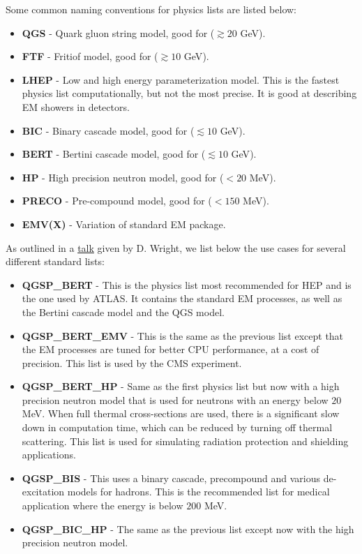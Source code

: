 \documentclass[8pt]{refart}
\begin{document}
 Some common naming conventions for physics lists are listed below:
\begin{itemize}
    \item \textbf{QGS} - Quark gluon string model, good for ({\color{red}$\gtrsim 20$ GeV}).
    \item \textbf{FTF} - Fritiof model, good for ({\color{red}$\gtrsim 10$ GeV}).
    \item \textbf{LHEP} - Low and high energy parameterization model.  This is the fastest physics list computationally, but not the most precise.  It is good at describing EM showers in detectors.
    \item \textbf{BIC} - Binary cascade model, good for ({\color{magenta}$\lesssim 10$ GeV}).
    \item \textbf{BERT} - Bertini cascade model, good for ({\color{magenta}$\lesssim 10$ GeV}).
    \item \textbf{HP} - High precision neutron model, good for ({\color{blue}$< 20$ MeV}).
    \item \textbf{PRECO} - Pre-compound model, good for ({\color{blue}$< 150$ MeV}).
    \item \textbf{EMV(X)} - Variation of standard EM package.
\end{itemize}
As outlined in a \href{http://geant4.in2p3.fr/IMG/pdf_PhysicsLists.pdf}{talk} given by D. Wright, we list below the use cases for several different standard lists:
\begin{itemize}
    \item \textbf{QGSP\_BERT} - This is the physics list most recommended for HEP and is the one used by ATLAS.  It contains the standard EM processes, as well as the Bertini cascade model and the QGS model.
    \item \textbf{QGSP\_BERT\_EMV} - This is the same as the previous list except that the EM processes are tuned for better CPU performance, at a cost of precision.  This list is used by the CMS experiment.
    \item \textbf{QGSP\_BERT\_HP} - Same as the first physics list but now with a high precision neutron model that is used for neutrons with an energy below $20$ MeV.  When full thermal cross-sections are used, there is a significant slow down in computation time, which can be reduced by turning off thermal scattering.  This list is used for simulating radiation protection and shielding applications.
    \item \textbf{QGSP\_BIS} - This uses a binary cascade, precompound and various de-excitation models for hadrons.  This is the recommended list for medical application where the energy is below $200$ MeV.
    \item \textbf{QGSP\_BIC\_HP} - The same as the previous list except now with the high precision neutron model.
\end{itemize}
\end{document}
